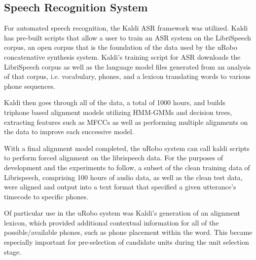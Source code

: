 \documentclass[10pt, journal, compsoc]{IEEEtran}
\begin{document}
\subsection{Speech Recognition System}
For automated speech recognition, the Kaldi ASR framework was utilized.\cite{Povey_ASRU2011} Kaldi has pre-built scripts that allow a user to train an ASR system on the LibriSpeech corpus\cite{unknown}, an open corpus that is the foundation of the data used by the uRobo concatenative synthesis system. Kaldi's training script for ASR downloads the LibriSpeech corpus as well as the language model files generated from an analysis of that corpus, i.e. vocabulary, phones, and a lexicon translating words to various phone sequences.\par
Kaldi then goes through all of the data, a total of 1000 hours, and builds triphone based alignment models utilizing HMM-GMMs and decision trees, extracting features such as MFCCs as well as performing multiple alignments on the data to improve each successive model.\par
With a final alignment model completed, the uRobo system can call kaldi scripts to perform forced alignment on the librispeech data. For the purposes of development and the experiments to follow, a subset of the clean training data of Librispeech, comprising 100 hours of audio data, as well as the clean test data, were aligned and output into a text format that specified a given utterance's timecode to specific phones. \par
Of particular use in the uRobo system was Kaldi's generation of an alignment lexicon, which provided additional contextual information for all of the possible/available phones, such as phone placement within the word. This became especially important for pre-selection of candidate units during the unit selection stage.
\end{document}
